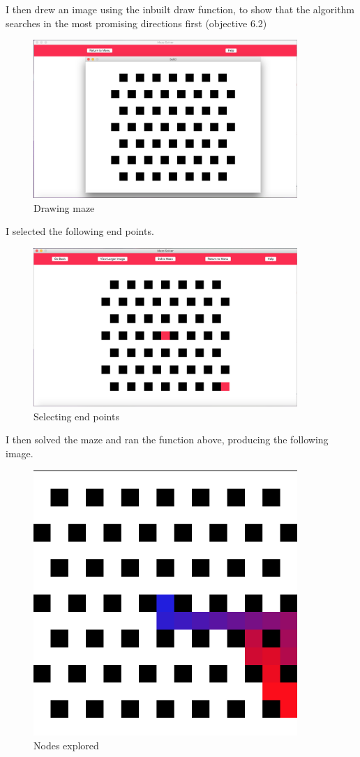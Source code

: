 \documentclass[titlepage]{article}
\begin{document}
I then drew an image using the inbuilt draw function, to show that the algorithm searches in the most promising directions first (objective 6.2)

\begin{figure}[H]
  \centering
  \includegraphics[width=10cm]{honey.png}
  \caption{Drawing maze}
  \label{fig:dijk}
\end{figure}

I selected the following end points.

\begin{figure}[H]
  \centering
  \includegraphics[width=10cm]{honeyep.png}
  \caption{Selecting end points}
  \label{fig:dijk}
\end{figure}

I then solved the maze and ran the function above, producing the following image.

\begin{figure}[H]
  \centering
  \includegraphics[width=10cm]{honeyop.png}
  \caption{Nodes explored}
  \label{fig:dijk}
\end{figure}
\end{document}
